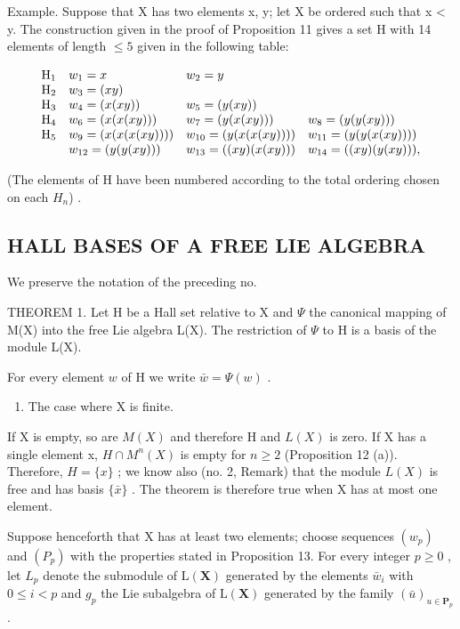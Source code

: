 Example. Suppose that X has two elements x, y; let X be ordered such that x < y. The construction given in the proof of Proposition 11 gives a set H with 14 elements of length \(\leqslant 5\) given in the following table:

\[
\begin{array}{l l l l} \mathrm{H} _ {1} & w _ {1} = x & w _ {2} = y \\ \mathrm{H} _ {2} & w _ {3} = (x y) \\ \mathrm{H} _ {3} & w _ {4} = (x (x y)) & w _ {5} = (y (x y)) \\ \mathrm{H} _ {4} & w _ {6} = (x (x (x y))) & w _ {7} = (y (x (x y))) & w _ {8} = (y (y (x y))) \\ \mathrm{H} _ {5} & w _ {9} = (x (x (x (x y)))) & w _ {10} = (y (x (x (x y)))) & w _ {11} = (y (y (x (x y)))) \\ & w _ {12} = (y (y (x y))) & w _ {13} = ((x y) (x (x y))) & w _ {14} = ((x y) (y (x y))), \end{array}
\]

(The elements of H have been numbered according to the total ordering chosen on each \(H_{n}\)) .

\subsection{HALL BASES OF A FREE LIE ALGEBRA}

We preserve the notation of the preceding no.

THEOREM 1. Let H be a Hall set relative to X and \(\Psi\) the canonical mapping of M(X) into the free Lie algebra L(X). The restriction of \(\Psi\) to H is a basis of the module L(X).

For every element \(w\) of H we write \(\bar{w} = \Psi(w)\) .

\begin{enumerate}
\def\labelenumi{(\Alph{enumi})}
\tightlist
\item
  The case where X is finite.
\end{enumerate}

If X is empty, so are \(M(X)\) and therefore H and \(L(X)\) is zero. If X has a single element x, \(H \cap M^{n}(X)\) is empty for \(n \geqslant 2\) (Proposition 12 (a)). Therefore, \(H = \{x\}\) ; we know also (no. 2, Remark) that the module \(L(X)\) is free and has basis \(\{\bar{x}\}\) . The theorem is therefore true when X has at most one element.

Suppose henceforth that X has at least two elements; choose sequences \((w_{p})\) and \((P_{p})\) with the properties stated in Proposition 13. For every integer \(p \geqslant 0\) , let \(L_{p}\) denote the submodule of \(\mathrm{L}(\mathbf{X})\) generated by the elements \(\bar{w}_{i}\) with \(0 \leqslant i < p\) and \(g_{p}\) the Lie subalgebra of \(\mathrm{L}(\mathbf{X})\) generated by the family \((\bar{u})_{u \in \mathbf{P}_{p}}\) .


